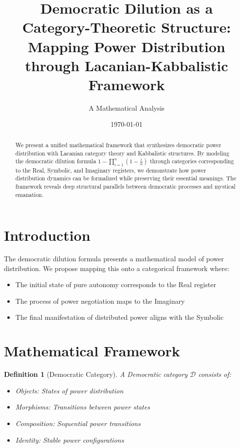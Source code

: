\documentclass[12pt]{article}
\title{Democratic Dilution as a Category-Theoretic Structure:\\
Mapping Power Distribution through Lacanian-Kabbalistic Framework}
\author{A Mathematical Analysis}
\date{\today}
\theoremstyle{plain}
\newtheorem{definition}{Definition}
\begin{document}
\maketitle

\begin{abstract}
We present a unified mathematical framework that synthesizes democratic power distribution with Lacanian category theory and Kabbalistic structures. By modeling the democratic dilution formula $1 - \prod_{i=1}^n(1-\frac{i}{n})$ through categories corresponding to the Real, Symbolic, and Imaginary registers, we demonstrate how power distribution dynamics can be formalized while preserving their essential meanings. The framework reveals deep structural parallels between democratic processes and mystical emanation.
\end{abstract}

\section{Introduction}

The democratic dilution formula presents a mathematical model of power distribution. We propose mapping this onto a categorical framework where:

\begin{itemize}
    \item The initial state of pure autonomy corresponds to the Real register
    \item The process of power negotiation maps to the Imaginary
    \item The final manifestation of distributed power aligns with the Symbolic
\end{itemize}

\section{Mathematical Framework}

\begin{definition}[Democratic Category]
A Democratic category $\mathcal{D}$ consists of:
\begin{itemize}
    \item Objects: States of power distribution
    \item Morphisms: Transitions between power states
    \item Composition: Sequential power transitions
    \item Identity: Stable power configurations
\end{itemize}
\end{definition}
\end{document}
